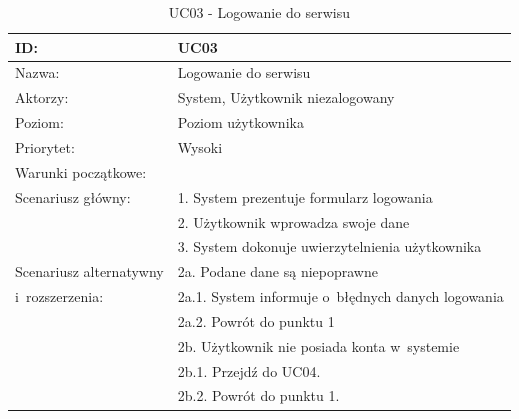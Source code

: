 \begin{table}[H]
    \begin{tabular}{|p{5cm}|p{9cm}|}\hline
    ID: & UC03 \\\hline
    Nazwa: & Logowanie do serwisu \\\hline
    Aktorzy: & System, Użytkownik niezalogowany \\\hline
    Poziom: & Poziom użytkownika  \\\hline
    Priorytet: & Wysoki \\\hline
    Warunki początkowe: & ~ \\\hline
    Scenariusz główny: & 1. System prezentuje formularz logowania \\
    ~ & 2. Użytkownik wprowadza swoje dane \\
    ~ & 3. System dokonuje uwierzytelnienia użytkownika \\ \hline
    Scenariusz alternatywny & 2a. Podane dane są niepoprawne \\
    i~rozszerzenia: & 2a.1. System informuje o~błędnych danych logowania \\
    ~ & 2a.2. Powrót do punktu 1 \\
    ~ & 2b. Użytkownik nie posiada konta w~systemie \\
    ~ & 2b.1. Przejdź do UC04. \\
    ~ & 2b.2. Powrót do punktu 1.  \\
    \hline\end{tabular}
	\caption{UC03 - Logowanie do serwisu}
\end{table}

